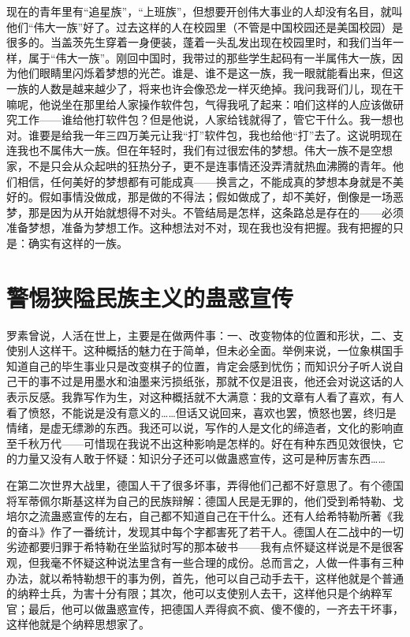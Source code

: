 现在的青年里有“追星族”，“上班族”，但想要开创伟大事业的人却没有名目，就叫他们“伟大一族”好了。过去这样的人在校园里（不管是中国校园还是美国校园）是很多的。当盖茨先生穿着一身便装，蓬着一头乱发出现在校园里时，和我们当年一样，属于“伟大一族”。刚回中国时，我带过的那些学生起码有一半属伟大一族，因为他们眼睛里闪烁着梦想的光芒。谁是、谁不是这一族，我一眼就能看出来，但这一族的人数是越来越少了，将来也许会像恐龙一样灭绝掉。我问我哥们儿，现在干嘛呢，他说坐在那里给人家操作软件包，气得我吼了起来：咱们这样的人应该做研究工作——谁给他打软件包？但是他说，人家给钱就得了，管它干什么。我一想也对。谁要是给我一年三四万美元让我“打”软件包，我也给他“打”去了。这说明现在连我也不属伟大一族。但在年轻时，我们有过很宏伟的梦想。伟大一族不是空想家，不是只会从众起哄的狂热分子，更不是连事情还没弄清就热血沸腾的青年。他们相信，任何美好的梦想都有可能成真——换言之，不能成真的梦想本身就是不美好的。假如事情没做成，那是做的不得法；假如做成了，却不美好，倒像是一场恶梦，那是因为从开始就想得不对头。不管结局是怎样，这条路总是存在的——必须准备梦想，准备为梦想工作。这种想法对不对，现在我也没有把握。我有把握的只是：确实有这样的一族。

\chapter{警惕狭隘民族主义的蛊惑宣传}

罗素曾说，人活在世上，主要是在做两件事：一、改变物体的位置和形状，二、支使别人这样干。这种概括的魅力在于简单，但未必全面。举例来说，一位象棋国手知道自己的毕生事业只是改变棋子的位置，肯定会感到忧伤；而知识分子听人说自己干的事不过是用墨水和油墨来污损纸张，那就不仅是沮丧，他还会对说这话的人表示反感。我靠写作为生，对这种概括就不大满意：我的文章有人看了喜欢，有人看了愤怒，不能说是没有意义的……但话又说回来，喜欢也罢，愤怒也罢，终归是情绪，是虚无缥渺的东西。我还可以说，写作的人是文化的缔造者，文化的影响直至千秋万代——可惜现在我说不出这种影响是怎样的。好在有种东西见效很快，它的力量又没有人敢于怀疑：知识分子还可以做蛊惑宣传，这可是种厉害东西…… 

在第二次世界大战里，德国人干了很多坏事，弄得他们己都不好意思了。有个德国将军蒂佩尔斯基这样为自己的民族辩解：德国人民是无罪的，他们受到希特勒、戈培尔之流蛊惑宣传的左右，自己都不知道自己在干什么。还有人给希特勒所著《我的奋斗》作了一番统计，发现其中每个字都害死了若干人。德国人在二战中的一切劣迹都要归罪于希特勒在坐监狱时写的那本破书——我有点怀疑这样说是不是很客观，但我毫不怀疑这种说法里含有一些合理的成份。总而言之，人做一件事有三种办法，就以希特勒想干的事为例，首先，他可以自己动手去干，这样他就是个普通的纳粹士兵，为害十分有限；其次，他可以支使别人去干，这样他只是个纳粹军官；最后，他可以做蛊惑宣传，把德国人弄得疯不疯、傻不傻的，一齐去干坏事，这样他就是个纳粹思想家了。 

